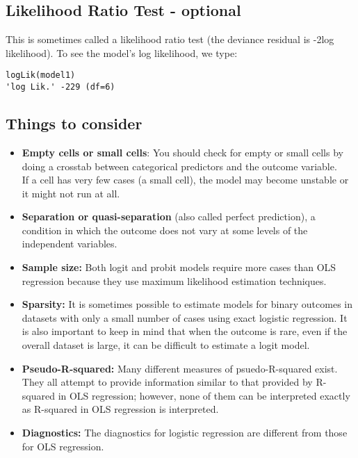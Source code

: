 \subsection{Likelihood Ratio Test - optional}
This is sometimes called a likelihood ratio test (the deviance residual is -2log likelihood). To see the model's log likelihood, we type:
\begin{verbatim}
logLik(model1)
'log Lik.' -229 (df=6)
\end{verbatim}
\subsection{Things to consider}
\begin{itemize}
\item \textbf{Empty cells or small cells}: You should check for empty or small cells by doing a crosstab between categorical predictors and the outcome variable.\\ If a cell has very few cases (a small cell), the model may become unstable or it might not run at all.
\item \textbf{Separation or quasi-separation} (also called perfect prediction), a condition in which the outcome does not vary at some levels of the independent variables. 
\item 
\textbf{Sample size:} Both logit and probit models require more cases than OLS regression because they use maximum likelihood estimation techniques. 
\item \textbf{Sparsity:}   It is sometimes possible to estimate models for binary outcomes in datasets with only a small number of cases using exact logistic regression. It is also important to keep in mind that when the outcome is rare, even if the overall dataset is large, it can be difficult to estimate a logit model.
\item \textbf{Pseudo-R-squared:} Many different measures of psuedo-R-squared exist. \\ They all attempt to provide information similar to that provided by R-squared in OLS regression; however, none of them can be interpreted exactly as R-squared in OLS regression is interpreted.
\item \textbf{Diagnostics:} The diagnostics for logistic regression are different from those for OLS regression. 
\end{itemize}



